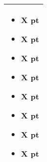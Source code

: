 \begin{tabular}{||m{532pt}||}
\begin{itemize}
		\item \quickref{Pyreshards} \hrulefill X pt
		\item \quickref{Sentient Singularity} \hrulefill X pt
		\item \quickref{Seismic Assault} \hrulefill X pt
		\item \quickref{Sky of Falling Stars} \hrulefill X pt
		\item \quickref{Swarm of Spirit Dust} \hrulefill X pt
		\item \quickref{Time's Arrow} \hrulefill X pt
		\item \quickref{Transdimensional Thunderbolt} \hrulefill X pt
		\item \quickref{Withering Worldscape} \hrulefill X pt
	\end{itemize} \\
	\hline
\end{tabular}



